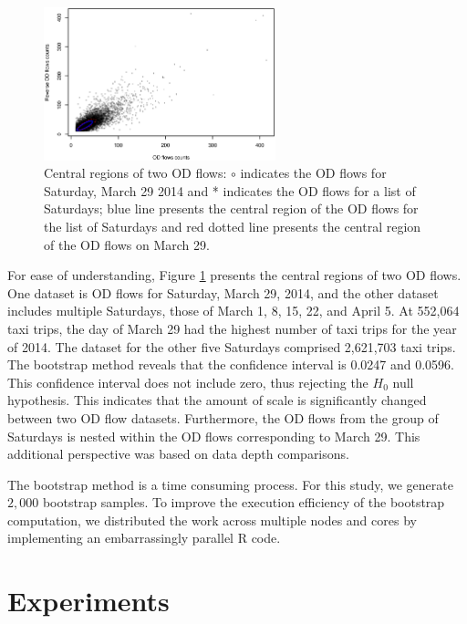 \documentclass[a4paper,UKenglish]{lipics-v2018}
\begin{document}
\begin{figure}
	\centering
	\includegraphics[width=0.6\textwidth]{images/com_mar_0329.eps}
	\caption{Central regions of two OD flows: $\circ$ indicates the OD flows for Saturday, March 29 2014 and * indicates the OD flows for a list of Saturdays; blue line presents the central region of the OD flows for the list of Saturdays and red dotted line presents the central region of the OD flows on March 29.}
	\label{fig:com_mar_0329}	
\end{figure}

For ease of understanding, Figure \ref{fig:com_mar_0329} presents the central regions of two OD flows. One dataset is OD flows for Saturday, March 29, 2014, and the other dataset includes multiple Saturdays, those of March  1, 8, 15, 22, and April 5. At 552,064 taxi trips, the day of March 29 had the highest number of taxi trips for the year of 2014. The dataset for the other five Saturdays comprised 2,621,703 taxi trips. The bootstrap method reveals that the confidence interval is 0.0247 and 0.0596. This confidence interval does not include zero, thus rejecting the $H_0$ null hypothesis. This indicates that the amount of scale is significantly changed between two OD flow datasets. Furthermore,  the OD flows from the group of Saturdays is nested within the OD flows corresponding to March 29. This additional perspective was based on data depth comparisons. 

The bootstrap method is a time consuming process. For this study,  we generate $2,000$ bootstrap samples. To improve the execution efficiency of the bootstrap computation, we distributed the work across multiple nodes and cores by implementing an embarrassingly parallel R code. 



\section{Experiments}
\label{sec:experiments}
\end{document}
